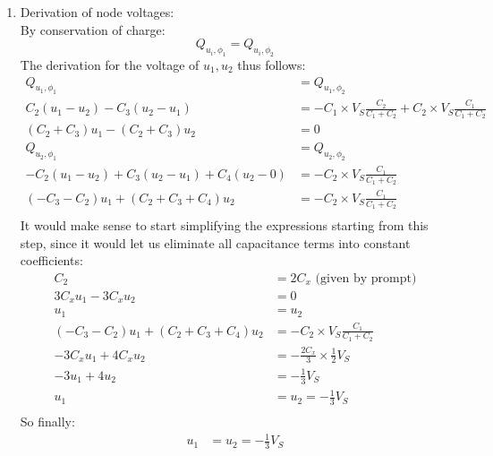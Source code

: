 {\begin{enumerate}
{\begin{enumerate}
{                }
                \item[4.] {
                    Derivation of node voltages: \\
                    By conservation of charge:
                    \[Q_{u_i, \phi_1} = Q_{u_i, \phi_2}\]
                    The derivation for the voltage of $u_1, u_2$ thus follows:
                    \begin{align*}
                        Q_{u_1, \phi_1} &= Q_{u_1, \phi_2} \\
                        C_2 (u_1 - u_2) - C_3 (u_2 - u_1) &= - C_1 \times V_S \frac{C_2}{C_1 + C_2} + C_2 \times V_S \frac{C_1}{C_1 + C_2} \\
                        (C_2 + C_3) u_1 - (C_2 + C_3) u_2 &= 0 \\
                        Q_{u_2, \phi_1} &= Q_{u_2, \phi_2} \\
                        - C_2 (u_1 - u_2) + C_3 (u_2 - u_1) + C_4 (u_2 - 0) &= - C_2 \times V_S \frac{C_1}{C_1 + C_2} \\
                        (- C_3 - C_2) u_1 + (C_2 + C_3 + C_4) u_2 &= - C_2 \times V_S \frac{C_1}{C_1 + C_2} \\
                    \end{align*}
                    It would make sense to start simplifying the expressions starting from this step, since it would let us eliminate all capacitance terms into constant coefficients:
                    \begin{align*}
                        C_2 &= 2C_x \text{ (given by prompt)} \\
                        3C_x u_1 - 3C_x u_2 &= 0 \\
                        u_1 &= u_2 \\
                        (- C_3 - C_2) u_1 + (C_2 + C_3 + C_4) u_2 &= - C_2 \times V_S \frac{C_1}{C_1 + C_2} \\
                        -3C_x u_1 + 4C_x u_2 &= - \frac{2C_x}{3} \times \frac{1}{2}V_S \\
                        -3u_1 + 4u_2 &= - \frac{1}{3} V_S \\
                        u_1 &= u_2 = - \frac{1}{3} V_S \\
                    \end{align*}
                    So finally:
                    \begin{align*}
                        u_1 &= u_2 = - \frac{1}{3} V_S \\
                    \end{align*}
                    
}
\end{enumerate}}
\end{enumerate}}
